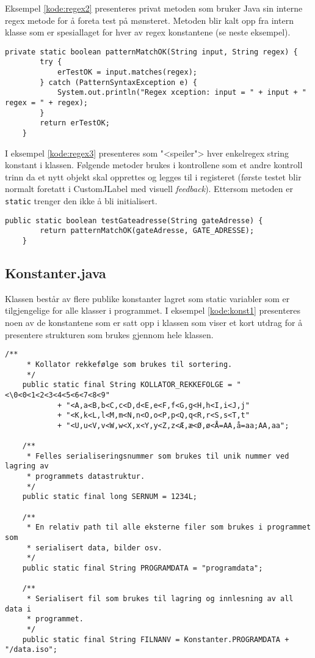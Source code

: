 Eksempel \ref{kode:regex2} presenteres privat metoden som bruker Java
sin interne regex metode for å foreta test på mønsteret. Metoden blir kalt opp fra intern klasse som er spesiallaget for hver av regex konstantene (se neste eksempel).

\begin{lstlisting}[caption=Private regex test metode., label=kode:regex2]
	private static boolean patternMatchOK(String input, String regex) {
        try {
            erTestOK = input.matches(regex);
        } catch (PatternSyntaxException e) {
            System.out.println("Regex xception: input = " + input + " regex = " + regex);
        }
        return erTestOK;
  	}
\end{lstlisting}


I eksempel \ref{kode:regex3} presenteres som "<speiler"> hver enkelregex string konstant i klassen. Følgende metoder brukes i kontrollene som et andre kontroll trinn da et nytt objekt skal opprettes og legges til i registeret (første testet blir normalt foretatt i CustomJLabel med visuell \textit{feedback}). Ettersom metoden er \texttt{static} trenger den ikke å bli initialisert. 


\begin{lstlisting}[caption=Static regex metode til tilhørende regex møsnter streng., label=kode:regex3]
    public static boolean testGateadresse(String gateAdresse) {
        return patternMatchOK(gateAdresse, GATE_ADRESSE);
    }
\end{lstlisting}


\subsection{Konstanter.java} \label{subsec:konstanter}
Klassen består av flere publike konstanter lagret som static variabler som er tilgjengelige for alle klasser i programmet. I eksempel \ref{kode:konst1} presenteres noen av de konstantene som er satt opp i klassen som viser et kort utdrag for å presentere strukturen som brukes gjennom hele klassen.

\begin{lstlisting}[caption=Noen av static kosntanter som brukes i Konstanter klassen., label=kode:konst1]
    /**
     * Kollator rekkefølge som brukes til sortering.
     */
    public static final String KOLLATOR_REKKEFOLGE = "<\0<0<1<2<3<4<5<6<7<8<9"
            + "<A,a<B,b<C,c<D,d<E,e<F,f<G,g<H,h<I,i<J,j"
            + "<K,k<L,l<M,m<N,n<O,o<P,p<Q,q<R,r<S,s<T,t"
            + "<U,u<V,v<W,w<X,x<Y,y<Z,z<Æ,æ<Ø,ø<Å=AA,å=aa;AA,aa";

    /**
     * Felles serialiseringsnummer som brukes til unik nummer ved lagring av
     * programmets datastruktur.
     */
    public static final long SERNUM = 1234L;

    /**
     * En relativ path til alle eksterne filer som brukes i programmet som
     * serialisert data, bilder osv.
     */
    public static final String PROGRAMDATA = "programdata";

    /**
     * Serialisert fil som brukes til lagring og innlesning av all data i
     * programmet.
     */
    public static final String FILNANV = Konstanter.PROGRAMDATA + "/data.iso";
\end{lstlisting}

